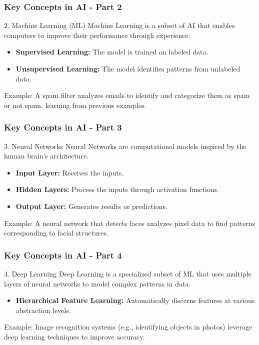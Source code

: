 \documentclass[aspectratio=169]{beamer}
\begin{document}
\begin{frame}[fragile]
    \frametitle{Key Concepts in AI - Part 2}
    \begin{block}{2. Machine Learning (ML)}
        Machine Learning is a subset of AI that enables computers to improve their performance through experience.
    \end{block}
    \begin{itemize}
        \item \textbf{Supervised Learning:} The model is trained on labeled data.
        \item \textbf{Unsupervised Learning:} The model identifies patterns from unlabeled data.
    \end{itemize}
    \begin{exampleblock}{Example:}
        A spam filter analyzes emails to identify and categorize them as spam or not spam, learning from previous examples.
    \end{exampleblock}
\end{frame}

\begin{frame}[fragile]
    \frametitle{Key Concepts in AI - Part 3}
    \begin{block}{3. Neural Networks}
        Neural Networks are computational models inspired by the human brain's architecture.
    \end{block}
    \begin{itemize}
        \item \textbf{Input Layer:} Receives the inputs.
        \item \textbf{Hidden Layers:} Process the inputs through activation functions.
        \item \textbf{Output Layer:} Generates results or predictions.
    \end{itemize}
    \begin{exampleblock}{Example:}
        A neural network that detects faces analyzes pixel data to find patterns corresponding to facial structures.
    \end{exampleblock}
\end{frame}

\begin{frame}[fragile]
    \frametitle{Key Concepts in AI - Part 4}
    \begin{block}{4. Deep Learning}
        Deep Learning is a specialized subset of ML that uses multiple layers of neural networks to model complex patterns in data.
    \end{block}
    \begin{itemize}
        \item \textbf{Hierarchical Feature Learning:} Automatically discerns features at various abstraction levels.
    \end{itemize}
    \begin{exampleblock}{Example:}
        Image recognition systems (e.g., identifying objects in photos) leverage deep learning techniques to improve accuracy.
    \end{exampleblock}
\end{frame}
\end{document}
